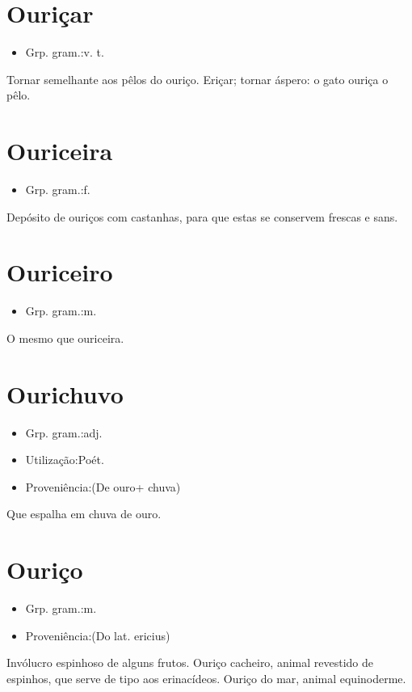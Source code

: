 \section{Ouriçar}
\begin{itemize}
\item {Grp. gram.:v. t.}
\end{itemize}
Tornar semelhante aos pêlos do ouriço.
Eriçar; tornar áspero: \textunderscore o gato ouriça o pêlo\textunderscore .
\section{Ouriceira}
\begin{itemize}
\item {Grp. gram.:f.}
\end{itemize}
Depósito de ouriços com castanhas, para que estas se conservem frescas e sans.
\section{Ouriceiro}
\begin{itemize}
\item {Grp. gram.:m.}
\end{itemize}
O mesmo que \textunderscore ouriceira\textunderscore .
\section{Ourichuvo}
\begin{itemize}
\item {Grp. gram.:adj.}
\end{itemize}
\begin{itemize}
\item {Utilização:Poét.}
\end{itemize}
\begin{itemize}
\item {Proveniência:(De \textunderscore ouro\textunderscore  + \textunderscore chuva\textunderscore )}
\end{itemize}
Que espalha em chuva de ouro.
\section{Ouriço}
\begin{itemize}
\item {Grp. gram.:m.}
\end{itemize}
\begin{itemize}
\item {Proveniência:(Do lat. \textunderscore ericius\textunderscore )}
\end{itemize}
Invólucro espinhoso de alguns frutos.
\textunderscore Ouriço cacheiro\textunderscore , animal revestido de espinhos, que serve de tipo aos erinacídeos.
\textunderscore Ouriço do mar\textunderscore , animal equinoderme.
